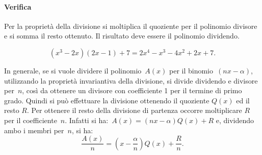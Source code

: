 \paragraph{Verifica}
Per la proprietà della divisione si moltiplica il quoziente per il
polinomio divisore e si somma il resto ottenuto. Il risultato deve
essere il polinomio dividendo.

\[\left(x^{3}-2x\right)(2x-1)+7=2x^{4}-x^{3}-4x^{2}+2x+7.\]

In generale, se si vuole dividere il polinomio~$A(x)$ per il binomio~$(nx-\alpha)$, utilizzando la proprietà invariantiva della
divisione, si divide dividendo e divisore per~$n$, così da ottenere un divisore con coefficiente 1 per il termine di primo grado. Quindi si può effettuare la divisione ottenendo il quoziente $Q(x)$ ed il resto $R$. Per ottenere il resto della divisione di
partenza occorre moltiplicare $R$ per il coefficiente~$n$.
Infatti si ha:~$A(x)=(nx-\alpha)Q(x)+R $
e, dividendo ambo i membri per~$n$, si ha:
\[\frac{A(x)}{n}=\left(x-\frac{\alpha }{n}\right)Q(x)+\frac{R}{n}.\]
\ovalbox{\risolvii \ref{ese:11.36}, \ref{ese:11.37}, \ref{ese:11.38}, \ref{ese:11.39}, \ref{ese:11.40}, \ref{ese:11.41}}
\newpage

\cleardoublepage
